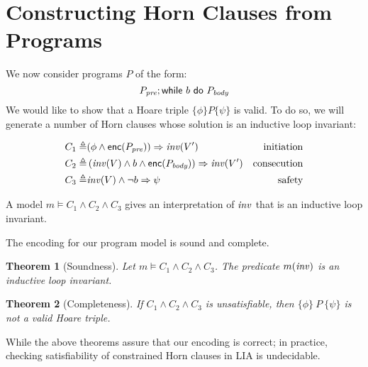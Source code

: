 \documentclass{amsart}
\newtheorem{theorem}{Theorem}[section]
\theoremstyle{definition}
\theoremstyle{remark}
\numberwithin{equation}{section}
\begin{document}
\section{Constructing Horn Clauses from Programs}
We now consider programs $P$
of the form:
$$P_{\emph{pre}}; \mathsf{while}~ b ~\mathsf{do}~ P_{\emph{body}}$$
We would like to show that a Hoare triple
$\{\phi\} P \{\psi\}$ is valid.
To do so, we will generate a number of Horn clauses
whose solution is an inductive loop invariant:

\begin{align*}
  C_1 \triangleq&
  (\phi \land \enc(P_\pre)) \Rightarrow \inv(V') & \text{initiation}\\
  C_2 \triangleq&
  \left(\inv(V) \land b \land
    \enc(P_\body)\right) \Rightarrow \inv(V') & \text{consecution}\\
%
  C_3 \triangleq&
    \inv(V) \land \neg b \Rightarrow \psi & \text{safety}
\end{align*}

A model $m \models C_1\land C_2 \land C_3$
gives an interpretation of $\mathit{inv}$ that is an inductive loop invariant.

The encoding for our program model is sound and complete.

\begin{theorem}[Soundness]
Let $m \models C_1 \land C_2 \land C_3$.
The predicate $m(\mathit{inv})$ is an inductive loop invariant.
\end{theorem}

\begin{theorem}[Completeness]
If $C_1 \land C_2 \land C_3$ is unsatisfiable,
then $\{\phi\} ~ P ~ \{\psi\}$ is not a valid Hoare triple.
\end{theorem}

While the above theorems assure that our encoding
is correct; in practice, checking satisfiability of
constrained Horn clauses in LIA is undecidable.
\end{document}
